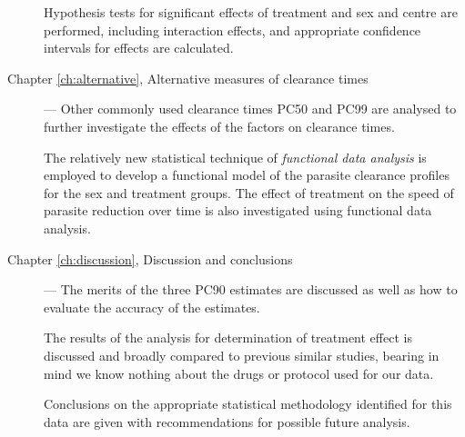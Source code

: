 \begin{description}
Hypothesis tests for significant effects of treatment and sex and centre are performed, including interaction effects, and appropriate confidence intervals for effects are calculated.
\item[Chapter \ref{ch:alternative}, Alternative measures of clearance times] --- Other commonly used clearance times PC50 and PC99 are analysed to further investigate the effects of the factors on clearance times.

The relatively new statistical technique of \emph{functional data analysis} is employed to develop a functional model of the parasite clearance profiles for the sex and treatment groups. The effect of treatment on the speed of parasite reduction over time is also investigated using functional data analysis. 
 
\item[Chapter \ref{ch:discussion}, Discussion and conclusions] --- The merits of the three PC90 estimates are discussed as well as how to evaluate the accuracy of the estimates.

The results of the analysis for determination of treatment effect is discussed and broadly compared to previous similar studies, bearing in mind we know nothing about the drugs or protocol used for our data.  

Conclusions on the appropriate statistical methodology identified for this data are given with recommendations for possible future analysis.
\end{description}
